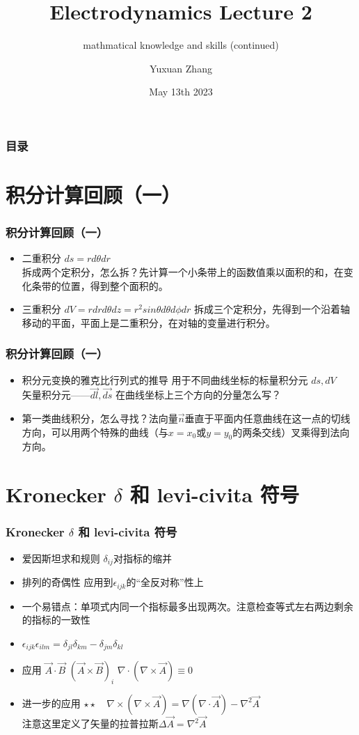 \documentclass[10pt]{beamer}
\title[About Beamer] %
{Electrodynamics Lecture 2}
\subtitle{mathmatical knowledge and skills (continued)}
\author %
{Yuxuan Zhang }
\institute[VFU] %
{
  School of Physics \quad
  Zhejiang University
}
\date[VLC 2021] %
{May 13th 2023}
\begin{document}
\frame{\titlepage}

\begin{frame}
    \frametitle{目录}
    \tableofcontents
\end{frame}

\section{积分计算回顾（一）}
\begin{frame}
    \frametitle{积分计算回顾（一）}
    \begin{itemize}
        \item 二重积分 $ds = r d\theta dr$\\
        拆成两个定积分，怎么拆？先计算一个小条带上的函数值乘以面积的和，在变化条带的位置，得到整个面积的。
        \item 三重积分 $dV = rdrd\theta dz = r^2 sin\theta d\theta d\phi dr$
        拆成三个定积分，先得到一个沿着轴移动的平面，平面上是二重积分，在对轴的变量进行积分。
    \end{itemize}
\end{frame}

\begin{frame}
    \frametitle{积分计算回顾（一）}
    \begin{itemize}
       \item  积分元变换的雅克比行列式的推导 \quad 用于不同曲线坐标的标量积分元 $ds,dV$\\
        矢量积分元——$\vec{dl},\vec{ds}$  在曲线坐标上三个方向的分量怎么写？     
        \item 第一类曲线积分，怎么寻找？法向量$\vec{n}$垂直于平面内任意曲线在这一点的切线方向，可以用两个特殊的曲线（与$x=x_0$或$y=y_0$的两条交线）叉乘得到法向方向。
    \end{itemize}
\end{frame}

\section{Kronecker $\delta$ 和 levi-civita 符号}
\begin{frame}
    \frametitle{ Kronecker $\delta$ 和 levi-civita 符号}
    \begin{itemize}
        \item 爱因斯坦求和规则 \quad $\delta_{ij}$对指标的缩并
        \item 排列的奇偶性 应用到$\epsilon_{ijk}$的“全反对称”性上
        \item 一个易错点：单项式内同一个指标最多出现两次。\quad 注意检查等式左右两边剩余的指标的一致性
        \item $\epsilon_{ijk} \epsilon_{ilm} = \delta_{jl}\delta_{km} - \delta_{jm}\delta_{kl}$ \quad 
        \item 应用 $\vec{A} \cdot \vec{B} $ \quad $(\vec{A}\times \vec{B})_i$ \quad $\nabla \cdot (\nabla \times \vec{A}) \equiv 0$
        \item 进一步的应用  $\star \star \quad \nabla \times (\nabla \times \vec{A}) = \nabla (\nabla\cdot \vec{A}) - \nabla^2 \vec{A}$ \\
注意这里定义了矢量的拉普拉斯$\Delta \vec{A} = \nabla^2 \vec{A}$
    \end{itemize}
\end{frame}
\end{document}
